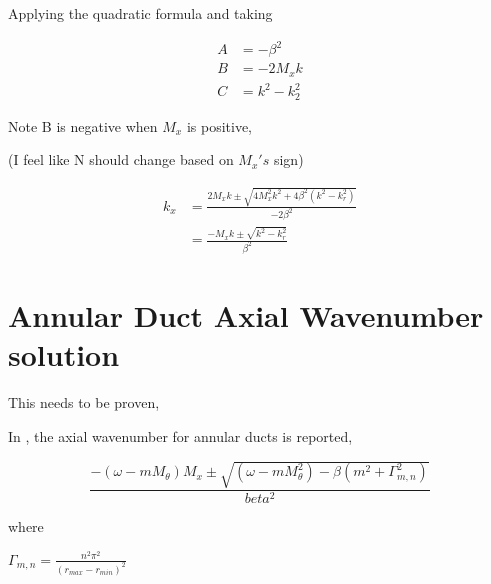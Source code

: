 Applying the quadratic formula and taking 

\begin{align*}
    A &= - \beta^2 \\
    B &= - 2M_x k\\
    C &= k^2 - k_2^2
\end{align*} 

Note B is negative when $M_x$ is positive,

(I feel like N should change based on $M_x's$ sign)

\begin{align*}
    k_x &= \frac{2M_x k \pm \sqrt{4 M_x^2 k^2 + 4 \beta^2 \left( k^2 - k_r^2 \right)}}{-2\beta^2}\\
        &= \frac{-M_x k \pm \sqrt{k^2 - k_r^2}}{\beta^2}
\end{align*}

\section{Annular Duct Axial Wavenumber solution}



This needs to be proven,


In \cite{Amr2001}, the axial wavenumber for annular ducts is reported,

\begin{equation*}
    \frac{-(\omega - m M_{\theta})M_x \pm \sqrt{\left( \omega - m M_{\theta}^2 \right) - \beta\left( m^2 + \Gamma_{m,n} ^2 \right)}}{beta^2}
\end{equation*}

where 

$\Gamma_{m,n}= \frac{n^2 \pi^2}{\left( r_{max} - r_{min} \right)^2}$

%
%


